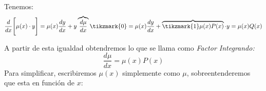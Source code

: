 Tenemos:
\[
\dfrac{d}{dx}\Bigg[\mu(x)\cdot y\Bigg]=\mu(x)\dfrac{dy}{dx}+y  \overbrace{\dfrac{d\mu}{dx}}\tikzmark{0}=\mu(x)\dfrac{dy}{dx}+ \overbrace{\tikzmark{1}\mu(x)P(x)}\cdot y =  \mu(x)Q(x)
\]
%

\pagebreak
A partir de esta igualdad obtendremos lo que se llama como \textit{Factor Integrando:}
$$\dfrac{d\mu}{dx}=\mu(x)P(x)$$
Para simplificar, escribiremos $\mu(x)$ simplemente como $\mu$, sobreentenderemos que esta en función de $x$:
